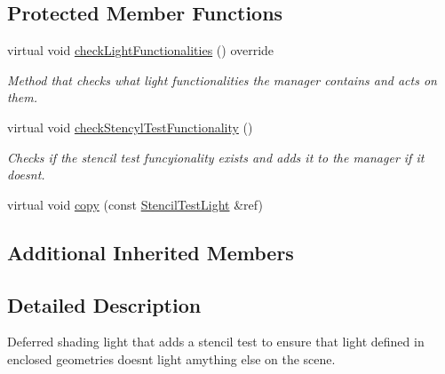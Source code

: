 \subsection*{Protected Member Functions}
\begin{DoxyCompactItemize}
\item 
\mbox{\label{class_geometry_engine_1_1_geometry_world_item_1_1_geometry_light_1_1_stencil_test_light_a8d1cc1d68eaae503e5ad54441341981e}} 
virtual void \mbox{\hyperlink{class_geometry_engine_1_1_geometry_world_item_1_1_geometry_light_1_1_stencil_test_light_a8d1cc1d68eaae503e5ad54441341981e}{check\+Light\+Functionalities}} () override
\begin{DoxyCompactList}\small\item\em Method that checks what light functionalities the manager contains and acts on them. \end{DoxyCompactList}\item 
\mbox{\label{class_geometry_engine_1_1_geometry_world_item_1_1_geometry_light_1_1_stencil_test_light_a0112c0c31998c6049a3fde496ca4df3d}} 
virtual void \mbox{\hyperlink{class_geometry_engine_1_1_geometry_world_item_1_1_geometry_light_1_1_stencil_test_light_a0112c0c31998c6049a3fde496ca4df3d}{check\+Stencyl\+Test\+Functionality}} ()
\begin{DoxyCompactList}\small\item\em Checks if the stencil test funcyionality exists and adds it to the manager if it doesn\textquotesingle{}t. \end{DoxyCompactList}\item 
virtual void \mbox{\hyperlink{class_geometry_engine_1_1_geometry_world_item_1_1_geometry_light_1_1_stencil_test_light_aa17706b35df8267c7421725548c7f399}{copy}} (const \mbox{\hyperlink{class_geometry_engine_1_1_geometry_world_item_1_1_geometry_light_1_1_stencil_test_light}{Stencil\+Test\+Light}} \&ref)
\end{DoxyCompactItemize}
\subsection*{Additional Inherited Members}


\subsection{Detailed Description}
Deferred shading light that adds a stencil test to ensure that light defined in enclosed geometries doesn\textquotesingle{}t light amything else on the scene. 

